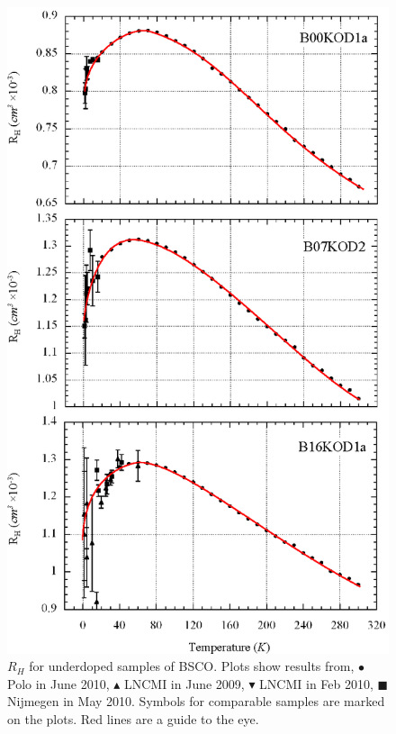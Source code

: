 \begin{figure}[htbp]
	\begin{center}
		\includegraphics[scale=0.9]{Chapter-HallBSCO/Figures/HallIndividual/HallIndividualOD}
		\caption{$R_H$ for underdoped samples of \ac{BSCO}. Plots show results from, $\bullet$ Polo in June 2010, $\blacktriangle$ \ac{LNCMI} in June 2009, $\blacktriangledown$ \ac{LNCMI} in Feb 2010, $\blacksquare$ Nijmegen in May 2010. Symbols for comparable samples are marked on the plots. Red lines are a guide to the eye.}
		\label{Fig:ExpH:HallIndividualOD}
	\end{center}
\end{figure}

